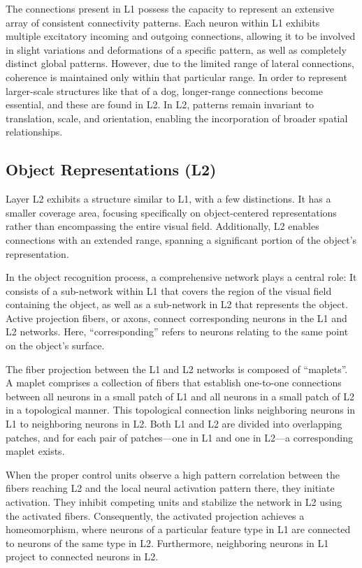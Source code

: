 The connections present in L1 possess the capacity to represent an extensive array of consistent connectivity patterns. Each neuron within L1 exhibits multiple excitatory incoming and outgoing connections, allowing it to be involved in slight variations and deformations of a specific pattern, as well as completely distinct global patterns. However, due to the limited range of lateral connections, coherence is maintained only within that particular range. In order to represent larger-scale structures like that of a dog, longer-range connections become essential, and these are found in L2. In L2, patterns remain invariant to translation, scale, and orientation, enabling the incorporation of broader spatial relationships.

\subsection{Object Representations (L2)}
Layer L2 exhibits a structure similar to L1, with a few distinctions. It has a smaller coverage area, focusing specifically on object-centered representations rather than encompassing the entire visual field. Additionally, L2 enables connections with an extended range, spanning a significant portion of the object's representation.

In the object recognition process, a comprehensive network plays a central role: It consists of a sub-network within L1 that covers the region of the visual field containing the object, as well as a sub-network in L2 that represents the object. Active projection fibers, or axons, connect corresponding neurons in the L1 and L2 networks. Here, ``corresponding'' refers to neurons relating to the same point on the object's surface.

The fiber projection between the L1 and L2 networks is composed of ``maplets''. A maplet comprises a collection of fibers that establish one-to-one connections between all neurons in a small patch of L1 and all neurons in a small patch of L2 in a topological manner. This topological connection links neighboring neurons in L1 to neighboring neurons in L2. Both L1 and L2 are divided into overlapping patches, and for each pair of patches—one in L1 and one in L2—a corresponding maplet exists.

When the proper control units observe a high pattern correlation between the fibers reaching L2 and the local neural activation pattern there, they initiate activation. They inhibit competing units and stabilize the network in L2 using the activated fibers. Consequently, the activated projection achieves a homeomorphism, where neurons of a particular feature type in L1 are connected to neurons of the same type in L2. Furthermore, neighboring neurons in L1 project to connected neurons in L2.




